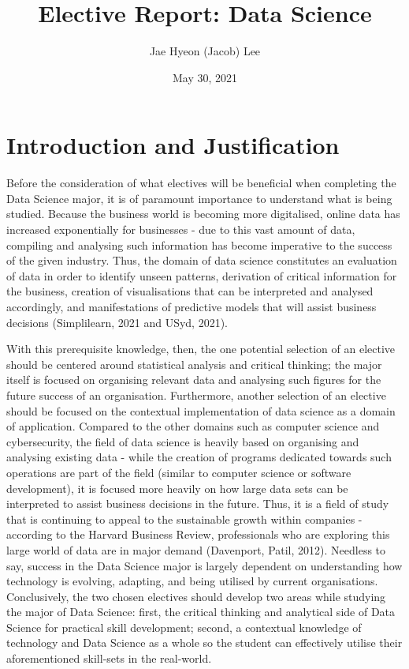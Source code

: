 \documentclass[11pt, a4paper]{report}
\title{\textbf{Elective Report: Data Science}}
\author{Jae Hyeon (Jacob) Lee}
\date{May 30, 2021}
\begin{document}
\sloppy

\maketitle

\section{\textbf{Introduction and Justification}}


Before the consideration of what electives will be beneficial when completing the Data Science major, it is of paramount importance to understand what is being studied. Because the business world is becoming more digitalised, online data has increased exponentially for businesses - due to this vast amount of data, compiling and analysing such information has become imperative to the success of the given industry. Thus, the domain of data science constitutes an evaluation of data in order to identify unseen patterns, derivation of critical information for the business, creation of visualisations that can be interpreted and analysed accordingly, and manifestations of predictive models that will assist business decisions (Simplilearn, 2021 and USyd, 2021). 


With this prerequisite knowledge, then, the one potential selection of an elective should be centered around statistical analysis and critical thinking; the major itself is focused on organising relevant data and analysing such figures for the future success of an organisation. Furthermore, another selection of an elective should be focused on the contextual implementation of data science as a domain of application. Compared to the other domains such as computer science and cybersecurity, the field of data science is heavily based on organising and analysing existing data - while the creation of programs dedicated towards such operations are part of the field (similar to computer science or software development), it is focused more heavily on how large data sets can be interpreted to assist business decisions in the future. Thus, it is a field of study that is continuing to appeal to the sustainable growth within companies - according to the Harvard Business Review, professionals who are exploring this large world of data are in major demand (Davenport, Patil, 2012). Needless to say, success in the Data Science major is largely dependent on understanding how technology is evolving, adapting, and being utilised by current organisations. Conclusively, the two chosen electives should develop two areas while studying the major of Data Science: first, the critical thinking and analytical side of Data Science for practical skill development; second, a contextual knowledge of technology and Data Science as a whole so the student can effectively utilise their aforementioned skill-sets in the real-world.
\end{document}

